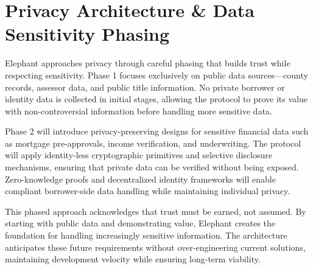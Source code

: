 \section{Privacy Architecture \& Data Sensitivity Phasing}

Elephant approaches privacy through careful phasing that builds trust while respecting sensitivity. Phase 1 focuses exclusively on public data sources—county records, assessor data, and public title information. No private borrower or identity data is collected in initial stages, allowing the protocol to prove its value with non-controversial information before handling more sensitive data.

Phase 2 will introduce privacy-preserving designs for sensitive financial data such as mortgage pre-approvals, income verification, and underwriting. The protocol will apply identity-less cryptographic primitives and selective disclosure mechanisms, ensuring that private data can be verified without being exposed. Zero-knowledge proofs and decentralized identity frameworks will enable compliant borrower-side data handling while maintaining individual privacy.

This phased approach acknowledges that trust must be earned, not assumed. By starting with public data and demonstrating value, Elephant creates the foundation for handling increasingly sensitive information. The architecture anticipates these future requirements without over-engineering current solutions, maintaining development velocity while ensuring long-term viability.

